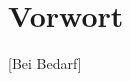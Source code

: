 \documentclass[./\jobname.tex]{subfiles}
\begin{document}
\chapter*{Vorwort}
[Bei Bedarf]
\end{document}
